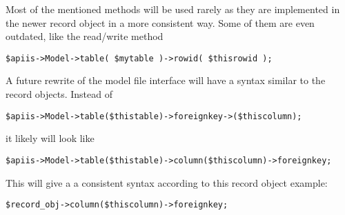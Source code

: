 Most of the mentioned methods will be used rarely as they are implemented in the
newer record object in a more consistent way. Some of them are even outdated, like
the read/write method
\begin{verbatim}
$apiis->Model->table( $mytable )->rowid( $thisrowid );
\end{verbatim}

A future rewrite of the model file interface will have a syntax similar to the record
objects. Instead of 
\begin{verbatim}
$apiis->Model->table($thistable)->foreignkey->($thiscolumn);
\end{verbatim}
it  likely will look like
\begin{verbatim}
$apiis->Model->table($thistable)->column($thiscolumn)->foreignkey;
\end{verbatim}
This will give a a consistent syntax according to this record object example:
\begin{verbatim}
$record_obj->column($thiscolumn)->foreignkey;
\end{verbatim}

